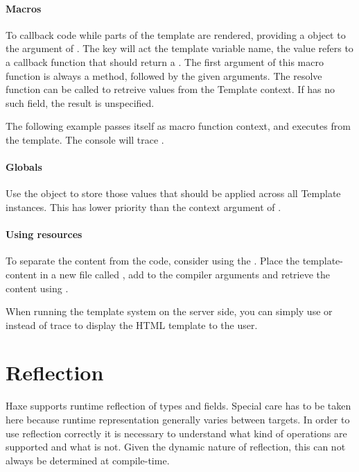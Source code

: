 \paragraph{Macros}
To callback code while parts of the template are rendered, providing a  object to the argument of . The key will act the template variable name, the value refers to a callback function that should return a . The first argument of this macro function is always a  method, followed by the given arguments. The resolve function can be called to retreive values from the Template context. If  has no such field, the result is unspecified.

The following example passes itself as macro function context, and executes  from the template.
The console will trace .

\paragraph{Globals}
Use the  object to store those values that should be applied across all Template instances. This has lower priority than the context argument of .

\paragraph{Using resources}

To separate the content from the code, consider using the . 
Place the template-content in a new file called , add  to the compiler arguments and retrieve the content using .

When running the template system on the server side, you can simply use  or  instead of trace to display the HTML template to the user.


\section{Reflection}
\label{std-reflection}

Haxe supports runtime reflection of types and fields. Special care has to be taken here because runtime representation generally varies between targets. In order to use reflection correctly it is necessary to understand what kind of operations are supported and what is not. Given the dynamic nature of reflection, this can not always be determined at compile-time.

